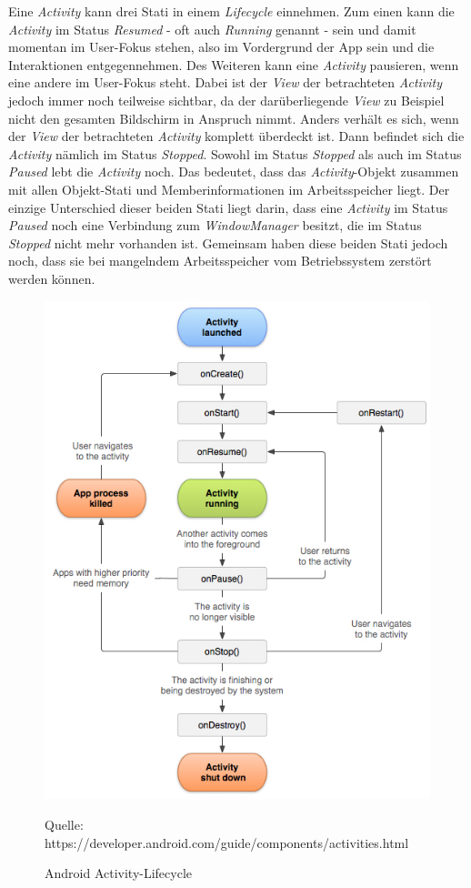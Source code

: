 Eine \textit{Activity} kann drei Stati in einem \textit{Lifecycle} einnehmen. Zum einen kann die \textit{Activity} im Status \textit{Resumed} - oft auch \textit{Running} genannt - sein und damit momentan im User-Fokus stehen, also im Vordergrund der App sein und die Interaktionen entgegennehmen. Des Weiteren kann eine \textit{Activity} pausieren, wenn eine andere im User-Fokus steht. Dabei ist der \textit{View} der betrachteten \textit{Activity} jedoch immer noch teilweise sichtbar, da der darüberliegende \textit{View} zu Beispiel nicht den gesamten Bildschirm in Anspruch nimmt. Anders verhält es sich, wenn der \textit{View} der betrachteten \textit{Activity} komplett überdeckt ist. Dann befindet sich die \textit{Activity} nämlich im Status \textit{Stopped}. Sowohl im Status \textit{Stopped} als auch im Status \textit{Paused} lebt die \textit{Activity} noch. Das bedeutet, dass das \textit{Activity}-Objekt zusammen mit allen Objekt-Stati und Memberinformationen im Arbeitsspeicher liegt. Der einzige Unterschied dieser beiden Stati liegt darin, dass eine \textit{Activity} im Status \textit{Paused} noch eine Verbindung zum \textit{WindowManager} besitzt, die im Status \textit{Stopped} nicht mehr vorhanden ist. Gemeinsam haben diese beiden Stati jedoch noch, dass sie bei mangelndem Arbeitsspeicher vom Betriebssystem zerstört werden können. 

\begin{figure}[h]
\centering
\includegraphics[width=0.8\linewidth]{content/images/Android-ActivityLifecycle}
\caption{Android Activity-Lifecycle}
Quelle: https://developer.android.com/guide/components/activities.html
\label{pic:androidActivityLifecycle}
\end{figure}

